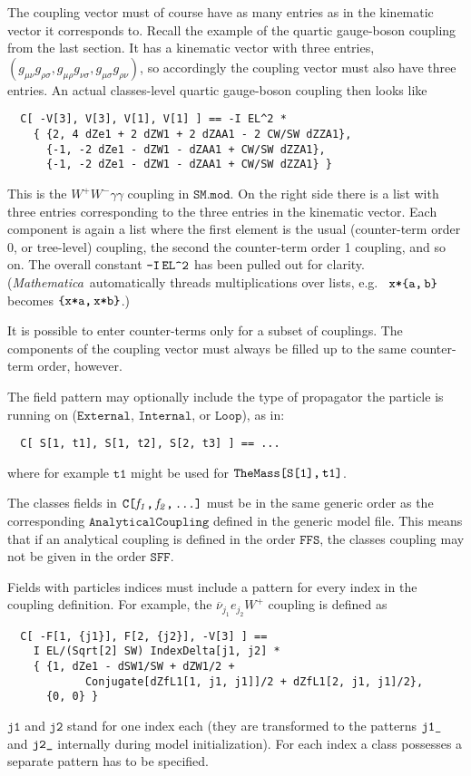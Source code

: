 \documentclass[twoside,12pt]{article}
\let\dots\textellipsis
\def\mma{{\it Mathematica}}
\def\eg{e.g.\ }
\def\lbrac{\symbol{123}}
\def\rbrac{\symbol{125}}
\def\Brac#1{\lbrac#1\rbrac}
\def\uscore{\symbol{95}}
\def\Code#1{\ensuremath{\texttt{#1}}}
\def\Var#1{\ensuremath{\mathit{#1}}}
\begin{document}
The coupling vector must of course have as many entries as in the
kinematic vector it corresponds to.  Recall the example of the quartic
gauge-boson coupling from the last section.  It has a kinematic vector 
with three entries, $(g_{\mu\nu} g_{\rho\sigma}, g_{\mu\rho} 
g_{\nu\sigma}, g_{\mu\sigma} g_{\rho\nu})$, so accordingly the coupling 
vector must also have three entries.  An actual classes-level quartic 
gauge-boson coupling then looks like%
%
%
%
%
\begin{verbatim}
  C[ -V[3], V[3], V[1], V[1] ] == -I EL^2 *
    { {2, 4 dZe1 + 2 dZW1 + 2 dZAA1 - 2 CW/SW dZZA1},
      {-1, -2 dZe1 - dZW1 - dZAA1 + CW/SW dZZA1},
      {-1, -2 dZe1 - dZW1 - dZAA1 + CW/SW dZZA1} }
\end{verbatim}
This is the $W^+W^-\gamma\gamma$ coupling in \Code{SM.mod}.  On the
right side there is a list with three entries corresponding to the three
entries in the kinematic vector.  Each component is again a list where
the first element is the usual (counter-term order 0, or tree-level)
coupling, the second the counter-term order 1 coupling, and so on.  The
overall constant \Code{-I\,EL\symbol{94}2} has been pulled out for
clarity.  (\mma\ automatically threads multiplications over lists, \eg
\Code{x*\Brac{a,\,b}} becomes \Code{\Brac{x*a,\,x*b}}.)

%
It is possible to enter counter-terms only for a subset of couplings.
The components of the coupling vector must always be filled up to the
same counter-term order, however.

The field pattern may optionally include the type of propagator the
particle is running on (\Code{External}, \Code{Internal}, or
\Code{Loop}), as in:
\begin{verbatim}
  C[ S[1, t1], S[1, t2], S[2, t3] ] == ...
\end{verbatim}
where for example \Code{t1} might be used for \Code{TheMass[S[1],\,t1]}.

The classes fields in \Code{C[\Var{f_1},\,\Var{f_2},\,\dots]} must be in
the same generic order as the corresponding \Code{AnalyticalCoupling}
defined in the generic model file.  This means that if an analytical
coupling is defined in the order \Code{FFS}, the classes coupling may
not be given in the order \Code{SFF}.

%
Fields with particles indices must include a pattern for every index in
the coupling definition.  For example, the 
$\overline{\nu}_{j_1}e_{j_2}W^+$ coupling is defined as
\begin{verbatim}
  C[ -F[1, {j1}], F[2, {j2}], -V[3] ] ==
    I EL/(Sqrt[2] SW) IndexDelta[j1, j2] *
    { {1, dZe1 - dSW1/SW + dZW1/2 +
            Conjugate[dZfL1[1, j1, j1]]/2 + dZfL1[2, j1, j1]/2},
      {0, 0} }
\end{verbatim}
\Code{j1} and \Code{j2} stand for one index each (they are transformed to
the patterns \Code{j1\uscore} and \Code{j2\uscore} internally during model 
initialization).  For each index a class possesses a separate pattern has
to be specified.
\end{document}
